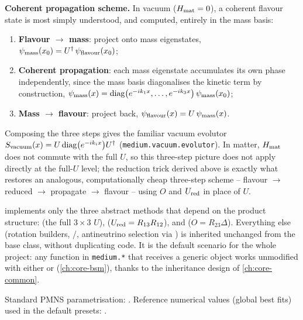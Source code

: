 \begin{keyeqbox}
\textbf{Coherent propagation scheme.} In vacuum ($H_{\rm mat}=0$), a
coherent flavour state is most simply understood, and computed, entirely
in the mass basis:
\begin{enumerate}
  \item \textbf{Flavour $\to$ mass}: project onto mass eigenstates,
    $\psi_{\rm mass}(x_0) = U^\dagger\,\psi_{\rm flavour}(x_0)$;
  \item \textbf{Coherent propagation}: each mass eigenstate accumulates its
    own phase independently, since the mass basis diagonalises the kinetic
    term by construction,
    $\psi_{\rm mass}(x) = \operatorname{diag}\bigl(e^{-ik_1x},\dots,e^{-ik_3x}\bigr)\,\psi_{\rm mass}(x_0)$;
  \item \textbf{Mass $\to$ flavour}: project back,
    $\psi_{\rm flavour}(x) = U\,\psi_{\rm mass}(x)$.
\end{enumerate}
Composing the three steps gives the familiar vacuum evolutor
$S_{\rm vacuum}(x)=U\operatorname{diag}\bigl(e^{-ik_ix}\bigr)U^\dagger$
(\texttt{medium.vacuum.evolutor}). In matter, $H_{\rm mat}$ does not
commute with the full $U$, so this three-step picture does not apply
directly at the full-$U$ level; the reduction trick derived above is
exactly what restores an analogous, computationally cheap three-step
scheme -- flavour $\to$ reduced $\to$ propagate $\to$ flavour -- using $O$
and $U_{\rm red}$ in place of $U$.
\end{keyeqbox}

\begin{implbox}
 implements only the three abstract
methods that depend on the product structure:  (the
full $3\times3$ $U$),  ($U_{\rm red}=R_{13}R_{12}$), and
 ($O=R_{23}\Delta$). Everything else (rotation
builders, /, antineutrino
selection via ) is inherited unchanged from the base
class, without duplicating code. It is the default scenario for the whole
project: any function in \texttt{medium.*} that receives a generic
 object works unmodified with either  or
 (\cref{ch:core-bsm}), thanks to the inheritance
design of \cref{ch:core-common}.
\end{implbox}

\begin{refbox}
Standard PMNS parametrisation: \cite{ParticleDataGroup}. Reference numerical
values (global best fits) used in the default presets:
\cite{Esteban2020NuFit,NuFit52}.
\end{refbox}

